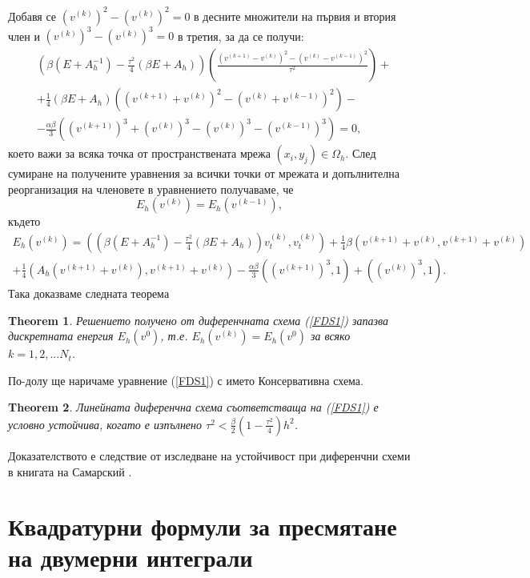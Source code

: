\documentclass{article}
\newcommand{\be}{\begin{equation}}
\newcommand{\ee}{\end{equation}}
\newcommand{\rf}[1]{(\ref{#1})}
\newtheorem{thm}{Theorem}
\begin{document}
Добавя се $(v^{(k)})^2 - (v^{(k)})^2 = 0$ в десните множители на първия и втория член и $(v^{(k)})^3 - (v^{(k)})^3 = 0$ в третия, за да се получи:
 \begin{align*}
&\left( \beta (E+A_h^{-1})- \frac{\tau^2}{4}(\beta E+A_h ) \right) \left( \frac{(v^{(k+1)} - v^{(k)} )^2 - (v^{(k)} - v^{(k-1)})^2}{\tau^2}   \right )  + \\
& +\frac{1}{4} (\beta E +A_h ) \left( (v^{(k+1)}+v^{(k)})^2 -  (v^{(k)}+v^{(k-1)})^2  \right ) - \\
&- \frac{\alpha \beta}{3}\left( (v^{(k+1)})^3 + (v^{(k)})^3 - (v^{(k)})^3 - (v^{(k-1)})^3 \right) =0,
\end{align*}
което важи за всяка точка от пространствената мрежа $(x_i,y_j) \in \Omega_h$. След сумиране на получените уравнения за всички точки от мрежата и допълнителна реорганизация на членовете в уравнението получаваме, че
\be \label{num_en}
E_h(v^{(k)}) =E_h(v^{(k-1)}),
\ee
където
\begin{align*}
E_h(v^{(k)})=\left( \left( \beta (E+A_h^{-1})- \frac{\tau^2}{4}(\beta E+A_h ) \right)v_{t}^{(k)} ,v_{t}^{(k)} \right)+\frac{1}{4} \beta \left(  v^{(k+1)}+v^{(k)}, v^{(k+1)}+v^{(k)} \right) \\
+\frac{1}{4}  \left(  A_h(v^{(k+1)}+v^{(k)}), v^{(k+1)}+v^{(k)} \right)
- \frac{\alpha \beta}{3}((v^{(k+1)})^3,1)+((v^{(k)})^3,1).
\end{align*}
Така доказваме следната теорема
\begin{thm}
Решението получено от диференчната схема \rf{FDS1} запазва дискретната енергия $E_h(v^0)$, т.е.  $E_h(v^{(k)}) =E_h(v^{0})$ за всяко $k=1,2,...N_t$.
\end{thm}
По-долу ще наричаме уравнение \rf{FDS1} с името Консервативна схема.

\begin{thm}
Линейната диференчна схема съответстваща на \rf{FDS1} е условно устойчива, когато е изпълнено
$\tau^2 < \frac{\beta}{2}(1-\frac{\tau^2}{4}) h^2$.

\end{thm}
Доказателството е следствие от изследване на устойчивост при диференчни схеми в книгата на 
Самарский \cite{samarski}.

\section{Квадратурни формули за пресмятане на двумерни интеграли}
\end{document}
